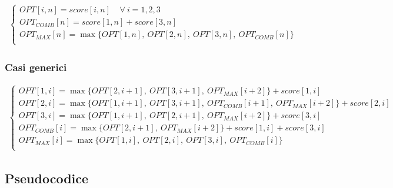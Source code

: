 \begin{align*}
	\begin{cases}                                                         
	OPT[i, n] = score[i, n] \ \ \ \ \ \forall\ i = 1, 2, 3                \\
	OPT_{COMB}[n] = score[1,n] + score[3,n]                               \\
	OPT_{MAX}[n] = \max\{OPT[1,n],\ OPT[2,n],\ OPT[3,n],\ OPT_{COMB}[n]\} \\
	\end{cases}                                                           
\end{align*}

\subsubsection*{Casi generici}

\begin{align*}
	\begin{cases}                                                                                          
	OPT[1, i] = \max\{OPT[2, i + 1],\ OPT[3, i + 1],\ OPT_{MAX}[i + 2]\} + score[1, i]                     \\
	OPT[2, i] = \max\{OPT[1, i + 1],\ OPT[3, i + 1],\ OPT_{COMB}[i + 1],\ OPT_{MAX}[i + 2]\} + score[2, i] \\
	OPT[3, i] = \max\{OPT[1, i + 1],\ OPT[2, i + 1],\ OPT_{MAX}[i + 2]\} + score[3, i]                     \\
	OPT_{COMB}[i] = \max\{OPT[2, i + 1],\ OPT_{MAX}[i + 2]\} + score[1, i] + score[3, i]                   \\
	OPT_{MAX}[i] = \max\{OPT[1, i],\ OPT[2, i],\ OPT[3, i],\ OPT_{COMB}[i]\}                               \\
	\end{cases}                                                                                            
\end{align*}

\newpage
\subsection{Pseudocodice}

